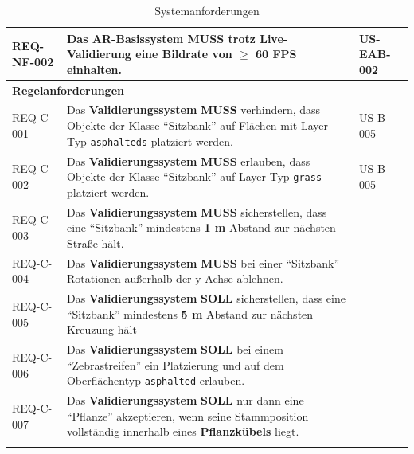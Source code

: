 \begin{longtable}{| p{3cm} | p{9cm} | p{2cm} |}
REQ-NF-002 & Das \textbf{AR-Basissystem} \textbf{MUSS} trotz Live-Validierung eine Bildrate von \textbf{$\geq$ 60 FPS} einhalten. & US-EAB-002 \\ 
\hline\hline
\multicolumn{2}{|l|}{\textbf{Regelanforderungen}} \\ 
\hline
REQ-C-001 & Das \textbf{Validierungssystem} \textbf{MUSS} verhindern, dass Objekte der Klasse \enquote{Sitzbank} auf Flächen mit Layer-Typ \verb|asphalteds| platziert werden. & US-B-005 \\ \hline
REQ-C-002 & Das \textbf{Validierungssystem} \textbf{MUSS} erlauben, dass Objekte der Klasse \enquote{Sitzbank} auf Layer-Typ \verb|grass| platziert werden. & US-B-005 \\ \hline
REQ-C-003 & Das \textbf{Validierungssystem} \textbf{MUSS} sicherstellen, dass eine \enquote{Sitzbank} mindestens \textbf{1 m} Abstand zur nächsten Straße hält. \\ \hline
REQ-C-004 & Das \textbf{Validierungssystem} \textbf{MUSS} bei einer \enquote{Sitzbank} Rotationen außerhalb der y-Achse ablehnen. & \\ \hline
REQ-C-005 & Das \textbf{Validierungssystem} \textbf{SOLL} sicherstellen, dass eine \enquote{Sitzbank} mindestens \textbf{5 m} Abstand zur nächsten Kreuzung hält & \\ \hline
REQ-C-006 & Das \textbf{Validierungssystem} \textbf{SOLL} bei einem \enquote{Zebrastreifen} ein Platzierung und auf dem Oberflächentyp \verb|asphalted| erlauben. & \\ \hline
REQ-C-007 & Das \textbf{Validierungssystem} \textbf{SOLL} nur dann eine \enquote{Pflanze} akzeptieren, wenn seine Stammposition vollständig innerhalb eines \textbf{Pflanzkübels} liegt. & \\ 
\hline

\caption{Systemanforderungen}
\label{tab:Systemanforderungen}
\end{longtable}
\FloatBarrier